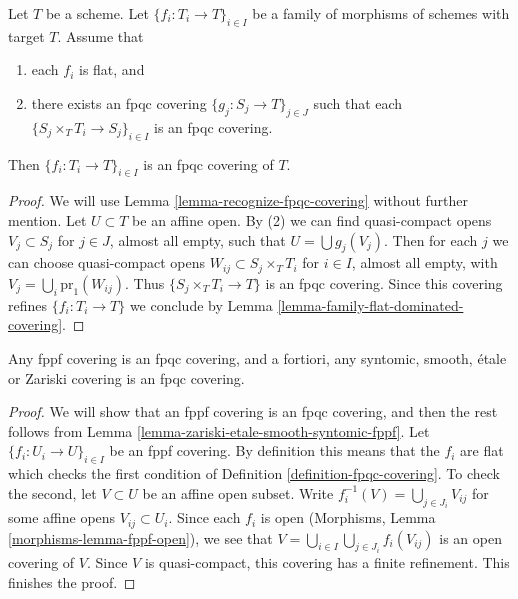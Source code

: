 \begin{lemma}
\label{lemma-family-flat-fpqc-local-covering}
Let $T$ be a scheme. Let $\{f_i : T_i \to T\}_{i \in I}$ be a family of
morphisms of schemes with target $T$. Assume that
\begin{enumerate}
\item each $f_i$ is flat, and
\item there exists an fpqc covering
$\{g_j : S_j \to T\}_{j \in J}$ such that each
$\{S_j \times_T T_i \to S_j\}_{i \in I}$ is an fpqc covering.
\end{enumerate}
Then $\{f_i : T_i \to T\}_{i \in I}$ is an fpqc covering of $T$.
\end{lemma}

\begin{proof}
We will use Lemma \ref{lemma-recognize-fpqc-covering} without further
mention. Let $U \subset T$ be an affine open. By (2) we can find
quasi-compact opens $V_j \subset S_j$ for $j \in J$, almost all empty, such that
$U = \bigcup g_j(V_j)$. Then for each $j$ we can choose quasi-compact
opens $W_{ij} \subset S_j \times_T T_i$ for $i \in I$, almost all empty,
with $V_j = \bigcup_i \text{pr}_1(W_{ij})$. Thus
$\{S_j \times_T T_i \to T\}$ is an fpqc covering.
Since this covering refines $\{f_i : T_i \to T\}$ we conclude by
Lemma \ref{lemma-family-flat-dominated-covering}.
\end{proof}

\begin{lemma}
\label{lemma-zariski-etale-smooth-syntomic-fppf-fpqc}
Any fppf covering is an fpqc covering, and a fortiori,
any syntomic, smooth, \'etale or Zariski covering is an fpqc covering.
\end{lemma}

\begin{proof}
We will show that an fppf covering is an fpqc covering, and then the
rest follows from
Lemma \ref{lemma-zariski-etale-smooth-syntomic-fppf}.
Let $\{f_i : U_i \to U\}_{i \in I}$ be an fppf covering.
By definition this means that the $f_i$ are flat which checks the first
condition of Definition \ref{definition-fpqc-covering}. To check the
second, let $V \subset U$ be an affine open subset.
Write $f_i^{-1}(V) = \bigcup_{j \in J_i} V_{ij}$
for some affine opens $V_{ij} \subset U_i$. Since each $f_i$ is open
(Morphisms, Lemma \ref{morphisms-lemma-fppf-open}), we see that
$V = \bigcup_{i\in I} \bigcup_{j \in J_i} f_i(V_{ij})$
is an open covering of $V$.
Since $V$ is quasi-compact, this covering has a finite
refinement. This finishes the proof.
\end{proof}

